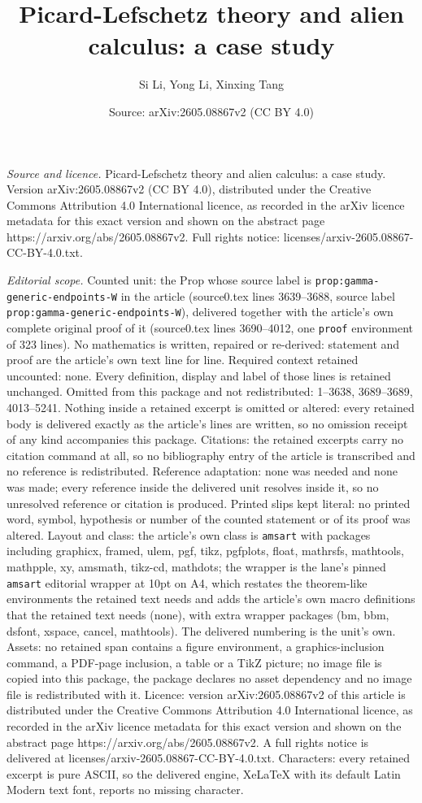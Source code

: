 \documentclass[10pt,a4paper]{amsart}
\title[Picard-Lefschetz theory and alien calculus: a case study]{Picard-Lefschetz theory and alien calculus: a case study}
\author{Si Li, Yong Li, Xinxing Tang}
\date{Source: arXiv:2605.08867v2 (CC BY 4.0)}
\begin{document}
\maketitle

\noindent\emph{Source and licence.} Picard-Lefschetz theory and alien calculus: a case study. Version arXiv:2605.08867v2 (CC BY 4.0), distributed under the Creative Commons Attribution 4.0 International licence, as recorded in the arXiv licence metadata for this exact version and shown on the abstract page https://arxiv.org/abs/2605.08867v2. Full rights notice: licenses/arxiv-2605.08867-CC-BY-4.0.txt.\par\smallskip

\noindent\textit{Editorial scope.} Counted unit: the Prop whose source label is \texttt{prop:gamma-generic-endpoints-W} in the article (source0.tex lines 3639--3688, source label \texttt{prop:gamma-generic-endpoints-W}), delivered together with the article's own complete original proof of it (source0.tex lines 3690--4012, one \texttt{proof} environment of 323 lines). No mathematics is written, repaired or re-derived: statement and proof are the article's own text line for line. Required context retained uncounted: none. Every definition, display and label of those lines is retained unchanged. Omitted from this package and not redistributed: 1--3638, 3689--3689, 4013--5241. Nothing inside a retained excerpt is omitted or altered: every retained body is delivered exactly as the article's lines are written, so no omission receipt of any kind accompanies this package. Citations: the retained excerpts carry no citation command at all, so no bibliography entry of the article is transcribed and no reference is redistributed. Reference adaptation: none was needed and none was made; every reference inside the delivered unit resolves inside it, so no unresolved reference or citation is produced. Printed slips kept literal: no printed word, symbol, hypothesis or number of the counted statement or of its proof was altered. Layout and class: the article's own class is \texttt{amsart} with packages including graphicx, framed, ulem, pgf, tikz, pgfplots, float, mathrsfs, mathtools, mathpple, xy, amsmath, tikz-cd, mathdots; the wrapper is the lane's pinned \texttt{amsart} editorial wrapper at 10pt on A4, which restates the theorem-like environments the retained text needs and adds the article's own macro definitions that the retained text needs (none), with extra wrapper packages (bm, bbm, dsfont, xspace, cancel, mathtools). The delivered numbering is the unit's own. Assets: no retained span contains a figure environment, a graphics-inclusion command, a PDF-page inclusion, a table or a TikZ picture; no image file is copied into this package, the package declares no asset dependency and no image file is redistributed with it. Licence: version arXiv:2605.08867v2 of this article is distributed under the Creative Commons Attribution 4.0 International licence, as recorded in the arXiv licence metadata for this exact version and shown on the abstract page https://arxiv.org/abs/2605.08867v2. A full rights notice is delivered at licenses/arxiv-2605.08867-CC-BY-4.0.txt. Characters: every retained excerpt is pure ASCII, so the delivered engine, XeLaTeX with its default Latin Modern text font, reports no missing character.
\end{document}

